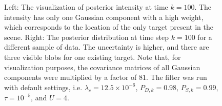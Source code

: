 \begin{figure}
\begin{subfigure}[]{0.48\linewidth}
    \end{subfigure}
  \caption[(C2). Comparison of posterior intensities for two cases.]{Left: The visualization of posterior intensity at time $k=100$. The intensity has only one Gaussian component with a high weight, which corresponds to the location of the only target present in the scene. Right: The posterior distribution at time step $k=100$ for a different sample of data. The uncertainty is higher, and there are three visible blobs for one existing target. Note that, for visualization purposes, the covariance matrices of all Gaussian components were multiplied by a factor of $81$. The filter was run with default settings, i.e. $\lambda_{c} = 12.5 \times 10^{-6}$, $P_{D,k} = 0.98$, $P_{S,k} = 0.99$, $\tau = 10^{-5}$, and $U=4$.}
  \label{fig:c2-post}
\end{figure}
